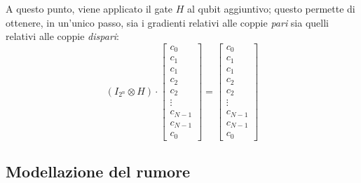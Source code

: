 A questo punto, viene applicato il gate $H$ al qubit aggiuntivo; questo permette
di ottenere, in un'unico passo, sia i gradienti relativi alle coppie \emph{pari} sia quelli relativi alle coppie \emph{dispari}:
\begin{equation}
	(I_{2^n} \otimes H) \cdot \begin{bmatrix}
		c_0\\c_1\\c_1\\c_2\\c_2\\\vdots\\c_{N-1}\\c_{N-1}\\c_0
	\end{bmatrix} = \begin{bmatrix}
		c_0\\c_1\\c_1\\c_2\\c_2\\\vdots\\c_{N-1}\\c_{N-1}\\c_0
	\end{bmatrix}
	\label{eq:h-to-adj-qubit}
\end{equation}


\subsection{Modellazione del rumore}
